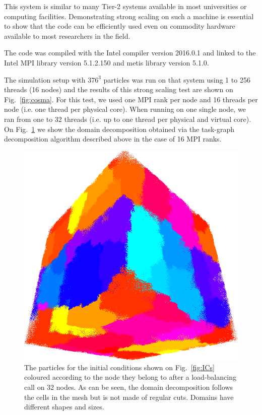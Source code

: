 \documentclass{sig-alternate-05-2015}
\begin{document}
This system is similar to many Tier-2 systems available in most universities or
computing facilities. Demonstrating strong scaling on such a machine is
essential to show that the code can be efficiently used even on commodity
hardware available to most researchers in the field.

The code was compiled with the Intel compiler version \textsc{2016.0.1} and
linked to the Intel MPI library version \textsc{5.1.2.150} and metis library
version \textsc{5.1.0}.

The simulation setup with $376^3$ particles was run on that system using 1 to
256 threads (16 nodes) and the results of this strong scaling test are shown on
Fig.~\ref{fig:cosma}. For this test, we used one MPI rank per node and 16
threads per node (i.e. one thread per physical core). When running on one single
node, we ran from one to 32 threads (i.e. up to one thread per physical and
virtual core). On Fig.~\ref{fig:domains} we show the domain decomposition
obtained via the task-graph decomposition algorithm described above in the case
of 16 MPI ranks.

\begin{figure}
\centering
\includegraphics[width=\columnwidth]{Figures/domains}
\caption{The particles for the initial conditions shown on Fig.~\ref{fig:ICs}
  coloured according to the node they belong to after a load-balancing call on
  32 nodes. As can be seen, the domain decomposition follows the cells in the mesh
  but is not made of regular cuts. Domains have different shapes and
  sizes. \label{fig:domains}}
\end{figure}  
\end{document}
